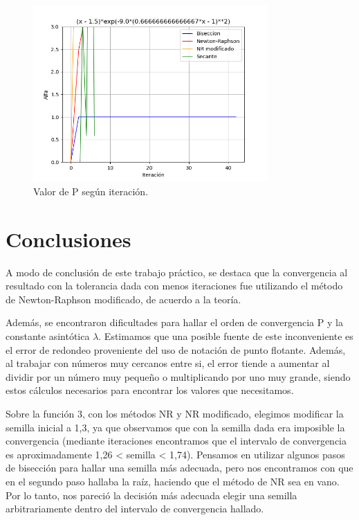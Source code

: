 \documentclass[titlepage,a4paper]{article}
\begin{document}
\begin{figure}[H]
    \centering
    \includegraphics[width=0.8\textwidth]{alfa f3.png}
    \caption{\label{fig:class01}Valor de P según iteración.}
\end{figure}


\section{Conclusiones}\label{sec:conclusiones}

A modo de conclusión de este trabajo práctico, se destaca que la convergencia al resultado con la tolerancia dada con menos iteraciones fue utilizando el método de Newton-Raphson modificado, de acuerdo a la teoría. 

 Además, se encontraron dificultades para hallar el orden de convergencia P y la constante asintótica $\lambda$. Estimamos que una posible fuente de este inconveniente es el error de redondeo proveniente del uso de notación de punto flotante. Además, al trabajar con números muy cercanos entre si, el error tiende a aumentar al dividir por un número muy pequeño o multiplicando por uno muy grande, siendo estos cálculos necesarios para encontrar los valores que necesitamos. 
 
 Sobre la función 3, con los métodos NR y NR modificado, elegimos modificar la semilla inicial a 1,3, ya que observamos que con la semilla dada era imposible la convergencia (mediante iteraciones encontramos que el intervalo de convergencia es aproximadamente 1,26 < semilla < 1,74). Pensamos en utilizar algunos pasos de bisección para hallar una semilla más adecuada, pero nos encontramos con que en el segundo paso hallaba la raíz, haciendo que el método de NR sea en vano. Por lo tanto, nos pareció la decisión más adecuada elegir una semilla arbitrariamente dentro del intervalo de convergencia hallado.
\end{document}
